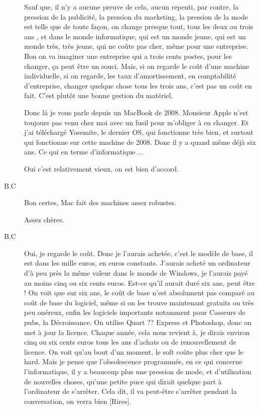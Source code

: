\begin{description}
Sauf que, il n'y a aucune preuve de cela, aucun repenti, par contre, la pression de la publicité, la pression du marketing, la pression de la mode est telle que de toute façon, on change presque tout, tous les deux ou trois ans , et dans le monde informatique, qui est un monde jeune, qui est un monde très, très jeune, qui ne coûte pas cher, même pour une entreprise. Bon on va imaginer une entreprise qui a trois cents postes, pour les changer, ça peut être un souci. Mais, si on regarde le coût d'une machine individuelle, si on regarde, les taux d'amortissement, en comptabilité d'entreprise, changer quelque chose tous les trois ans, c'est pas un coût en fait. C'est plutôt une bonne gestion du matériel.

Donc là je vous parle depuis un MacBook de 2008. Monsieur Apple n'est toujours pas venu chez moi avec un fusil pour m'obliger à en changer. Et j'ai téléchargé Yosemite, le dernier OS, qui fonctionne très bien, et surtout qui fonctionne sur cette machine de 2008. Donc il y a quand même déjà six ans. Ce qui en terme d'informatique ...

\vspace{1\baselineskip}

Oui c'est relativement vieux, on est bien d'accord.

\vspace{1\baselineskip}

\item[B.C]Bon certes, Mac fait des machines assez robustes.

\vspace{1\baselineskip}

Assez chères.

\vspace{1\baselineskip}

\item[B.C]Oui, je regarde le coût. Donc je l'aurais achetée, c'est le modèle de base, il est dans les mille euros, en euros constants. J'aurais acheté un ordinateur d'à peu près la même valeur dans le monde de Windows, je l'aurais payé au moins cinq ou six cents euros. Est-ce qu'il aurait duré six ans, peut être ! On voit que sur six ans, le coût de base n'est absolument pas comparé au coût de base du logiciel, même si on les trouve maintenant gratuits ou très peu onéreux, enfin les logiciels importants notamment pour Casseurs de pubs, la Décroissance. On utilise Quart ?? Express et Photoshop, donc on met à jour la licence. Chaque année, cela nous revient à, je dirais environ cinq ou six cents euros tous les ans d'achats ou de renouvellement de licence. On voit qu'au bout d'un moment, le soft coûte plus cher que le hard. Mais je pense que l'obsolescence programmée, en ce qui concerne l'informatique, il y a beaucoup plus une pression de mode, et d'utilisation de nouvelles choses, qu'une petite puce qui dirait quelque part à l'ordinateur de s'arrêter. Cela dit, il va peut-être s'arrêter pendant la conversation, on verra bien [Rires].


\end{description}
